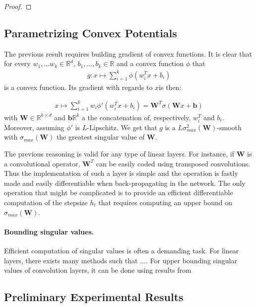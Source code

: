 \begin{proof}

\end{proof}
\subsection{Parametrizing Convex Potentials}

The previous result requires building gradient of convex functions. It is clear that for every $w_1,\dots w_k\in\mathbb{R}^d$, $b_1,\dots,b_k\in \mathbb{R}$ and a convex function $\phi$ that
\begin{align*}
    g:x\mapsto \sum_{i=1}^k\phi( w_i^Tx+b_i)
\end{align*}
is a convex function. Its gradient with regards to $x$is then:

\begin{align*}
    x\mapsto \sum_{i=1}^kw_i\phi'(w_i^Tx+b_i) = \mathbf{W}^T \sigma(\mathbf{W} x+\mathbf{b})
\end{align*}
with $\mathbf{W}\in \mathbb{R}^{k\times d}$ and $\mathbf{b}\mathbb{R}^{k}$ a the concatenation of, respectively, $w_i^T$ and $b_i$. Moreover, assuming $\phi'$ is $L$-Lipschitz. We get that $g$ is a $ L\sigma^2_{max}(\mathbf{W})$-smooth with  
$\sigma_{max}(\mathbf{W})$ the greatest singular value of $\mathbf{W}$. 

The previous reasoning is valid for any type of linear layers. For instance, if $\mathbf{W}$ is a convolutional operator, $\mathbf{W}^T$ can be easily coded using transposed convolutions. Thus the implementation of such a layer is simple and the operation is fastly made and easily differentiable when back-propagating in the network. The only operation that might be complicated is to provide an efficient differentiable computation of the stepsize $h_t$ that requires computing an upper bound on $\sigma_{max}(\mathbf{W})$.

\paragraph{Bounding singular values.} Efficient computation of singular values is often a demanding task. For linear layers, there exists many methods such that .... For upper bounding singular values of convolution layers, it can be done using results from 

\subsection{Preliminary Experimental Results}